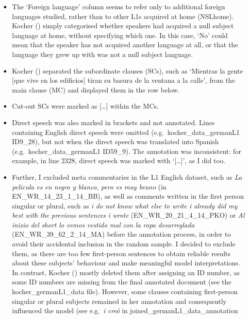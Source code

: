 \documentclass[
  letterpaper,
  DIV=11,
  numbers=noendperiod]{scrartcl}
\begin{document}
\begin{itemize}
\item
  The `Foreign language' column seems to refer only to additional
  foreign languages studied, rather than to other L1s acquired at home
  (NSLhome). Kocher () simply
  categorised whether speakers had acquired a null subject language at
  home, without specifying which one. In this case, `No' could mean that
  the speaker has not acquired another language at all, or that the
  language they grew up with was not a null subject language.
\item
  Kocher () separated the subordinate
  clauses (SCs), such as `Mientras la gente {[}que vive en los
  edificios{]} tiran su basura de la ventana a la calle', from the main
  clause (MC) and displayed them in the row below.
\item
  Cut-out SCs were marked as {[}\ldots{]} within the MCs.
\item
  Direct speech was also marked in brackets and not annotated. Lines
  containing English direct speech were omitted
  (e.g.~kocher\_data\_germanL1 ID9\_28), but not when the direct speech
  was translated into Spanish (e.g.~kocher\_data\_germanL1 ID59\_9). The
  annotation was inconsistent: for example, in line 2328, direct speech
  was marked with `{[}\ldots{]}', as I did too.
\item
  Further, I excluded meta commentaries in the L1 English dataset, such
  as \emph{La pelicula es en negro y blanco, pero es muy beuno} (in
  EN\_WR\_14\_23\_1\_14\_BB), as well as comments written in the first
  person singular or plural, such as \emph{i do not know what else to
  write i already did my best with the previous sentences i wrote}
  (EN\_WR\_20\_21\_4\_14\_PKO) or \emph{Al inizio del short lo vemos
  vestido mal con la ropa desarreglada} (EN\_WR\_39\_62\_2\_14\_MA)
  before the annotation process, in order to avoid their accidental
  inclusion in the random sample. I decided to exclude them, as there
  are too few first-person sentences to obtain reliable results about
  these subjects' behaviour and make meaningful model interpretations.
  In contrast, Kocher () mostly deleted
  them after assigning an ID number, as some ID numbers are missing from
  the final annotated document (see the kocher\_germanL1\_data file).
  However, some clauses containing first-person singular or plural
  subjects remained in her annotation and consequently influenced the
  model (see e.g.~\emph{i creó} in joined\_germanL1\_data\_annotation

\end{itemize}
\end{document}
